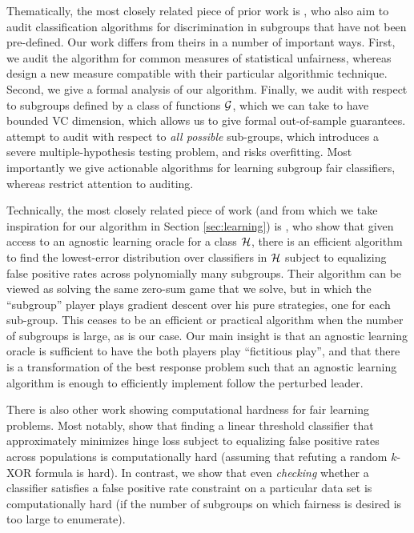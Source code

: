 Thematically, the most closely related piece of prior work is \cite{heuristicauditing}, who also aim to audit classification algorithms for discrimination in subgroups that have not been pre-defined. Our work differs from theirs in a number of important ways. First, we audit the algorithm for common measures of statistical unfairness, whereas \cite{heuristicauditing} design a new measure compatible with their particular algorithmic technique. Second, we give a formal analysis of our algorithm. Finally, we audit with respect to subgroups defined by a class of functions $\mathcal{G}$, which we can take to have bounded VC dimension, which allows us to give formal out-of-sample guarantees.  \cite{heuristicauditing} attempt to audit with respect to \emph{all possible} sub-groups, which introduces a severe multiple-hypothesis testing problem, and risks overfitting. Most importantly we give actionable algorithms for learning subgroup fair classifiers, whereas \cite{heuristicauditing} restrict attention to auditing.

Technically, the most closely related piece of work (and from which we take inspiration for our algorithm in Section \ref{sec:learning}) is \cite{reductions}, who show that given access to an agnostic learning oracle for a class $\mathcal{H}$, there is an efficient algorithm to find the lowest-error distribution over classifiers in $\mathcal{H}$ subject to equalizing false positive rates across polynomially many subgroups. Their algorithm can be viewed as solving the same zero-sum game that we solve, but in which the ``subgroup'' player plays gradient descent over his pure strategies, one for each sub-group. This ceases to be an efficient or practical algorithm when the number of subgroups is large, as is our case. Our main insight is that an agnostic learning oracle is sufficient to have the both players play ``fictitious play'', and that there is a transformation of the best response problem such that an agnostic learning algorithm is enough to efficiently implement follow the perturbed leader. 

There is also other work showing computational hardness for fair learning problems. Most notably, \cite{srebro} show that finding a linear threshold classifier that approximately minimizes hinge loss subject to equalizing false positive rates across populations is computationally hard (assuming that refuting a random $k$-XOR formula is hard). In contrast, we show that even \emph{checking} whether a classifier satisfies a false positive rate constraint on a particular data set is computationally hard (if the number of subgroups on which fairness is desired is too large to enumerate).

